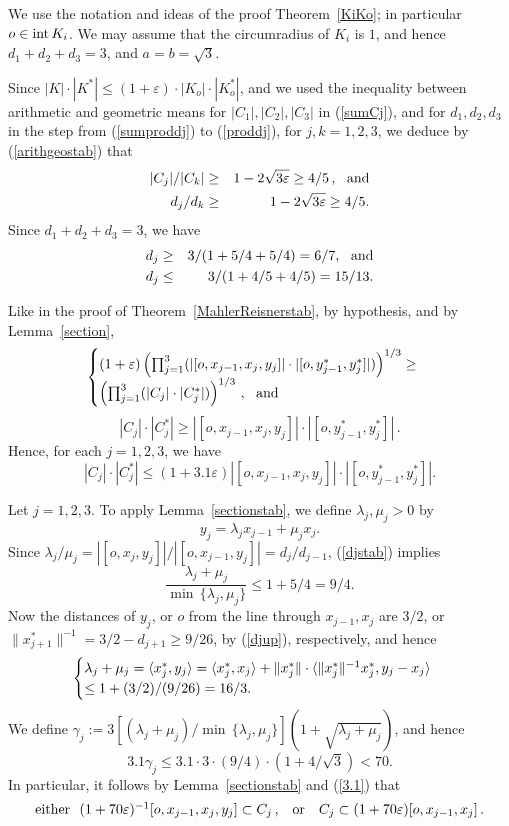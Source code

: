 \documentclass[12pt]{article}
\begin{document}
We use the notation and ideas of the proof Theorem~\ref{KiKo};
in particular $o\in{\rm int}\,K_i$.
We may assume that the circumradius of $K_i$ is $1$,
and hence $d_1+d_2+d_3=3$, and $a=b=\sqrt{3}$.

Since $|K|\cdot|K^*|\leq (1+\varepsilon)\cdot |K_o|\cdot|K_o^*|$,
and we used the inequality
between arithmetic and geometric means
for $|C_1|,|C_2|,|C_3|$ in (\ref{sumCj}),
and for $d_1,d_2,d_3$
in the step from (\ref{sumproddj})
to (\ref{proddj}),  for $j,k=1,2,3$,
we deduce by (\ref{arithgeostab}) that
\begin{eqnarray}
\label{Cjstab}
|C_j|/|C_k|&\geq& 1-2\sqrt{3\varepsilon}\geq 4/5\,, {\rm{\,\,\,\,and}}
\\
\label{djstab}
d_j/d_k&\geq& 1-2\sqrt{3\varepsilon}\geq 4/5.
\end{eqnarray}
Since  $d_1+d_2+d_3=3$, we have
\begin{eqnarray}
\label{djlow}
d_j&\geq& \mbox{$3/(1+5/4+5/4)=6/7,$} {\rm{\,\,\,\,\,and}}
\\
\label{djup}
d_j&\leq& \mbox{$3/(1+4/5+4/5)=15/13$}.
\end{eqnarray}

Like in the proof of Theorem~\ref{MahlerReisnerstab}, by hypothesis, and
by Lemma~\ref{section},
$$
\begin{cases}
(1+\varepsilon)\left(\prod_{j=1}^3 ( |[o,x_{j-1},x_j,y_j]|\cdot
|[o,y_{j-1}^*,y_j^*]| ) \right)^{1/3} \ge \\
\left(\prod_{j=1}^3 ( |C_j|\cdot |C_j^*| ) \right)^{1/3}\,,
{\text{\,\,\,\,and}}
\end{cases}
$$
$$
|C_j|\cdot |C_j^*| \ge |[o,x_{j-1},x_j,y_j]|\cdot
|[o,y_{j-1}^*,y_j^*]|\,.
$$
Hence, for each $j=1,2,3$, we have
\begin{equation}
\label{3.1}
|C_j|\cdot |C_j^*|\leq (1+3.1\varepsilon)|[o,x_{j-1},x_j,y_j]|\cdot
|[o,y_{j-1}^*,y_j^*]|.
\end{equation}

Let $j=1,2,3$. To apply Lemma~\ref{sectionstab}, we define 
$\lambda_j,\mu_j>0$ by
$$
y_j=\lambda_jx_{j-1}+\mu_jx_j.
$$
Since $\lambda_j/\mu_j=|[o,x_j,y_j]|/|[o,x_{j-1},y_j]|=
d_j/d_{j-1}$,
(\ref{djstab}) implies
$$
\frac{\lambda_j+\mu_j}{\min \, \{\lambda_j,\mu_j\}}\leq \mbox{$1+5/4=9/4$}.
$$
Now the distances of $y_j$, or $o$ from the line through 
$x_{j-1},x_j$ are $3/2$,
or $\|x_{j+1}^*\|^{-1}=3/2-d_{j+1}\geq 9/26$, by (\ref{djup}), 
respectively, and hence
$$
\begin{cases}
\lambda_j+\mu_j=\langle x_j^*,y_j\rangle=
\langle x_j^*,x_j\rangle+
\| x_j^* \| \cdot \langle \| x_j^* \| ^{-1} x_j^*,y_j-x_j\rangle \\
\leq\mbox{$ 1+( 3/2 ) /( 9/26 ) =16/3$}.
\end{cases}
$$
We define $\gamma_j:=3[(\lambda_j+\mu_j)/\min \, \{\lambda_j,\mu_j\} ]
(1+\sqrt{\lambda_j+\mu _j})$,
and hence
$$
3.1\gamma_j\leq \mbox{$3.1\cdot 3\cdot (9/4) \cdot (1+4/\sqrt{3})<70. $}
$$
In particular, it follows by Lemma~\ref{sectionstab} and (\ref{3.1}) that
$$
\mbox{either\,\, $(1+70\varepsilon)^{-1}[o,x_{j-1},x_j,y_j]\subset C_j$\,,
\,\, or \,\,
$C_j\subset(1+70\varepsilon)[o,x_{j-1},x_j]$}\,.
$$
\end{document}
